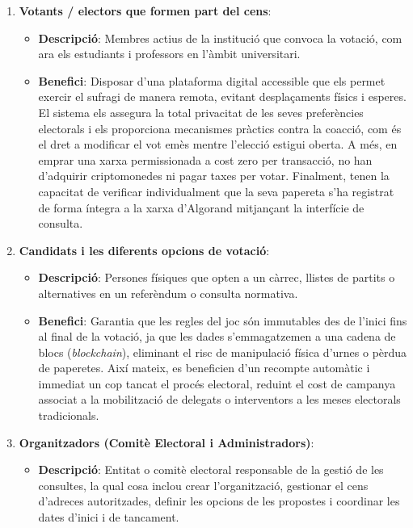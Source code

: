 \begin{enumerate}
    \item \textbf{Votants / electors que formen part del cens}:
    \begin{itemize}
        \item \textbf{Descripció}: Membres actius de la institució que convoca la votació, com ara els estudiants i
        professors en l'àmbit universitari.

        \item \textbf{Benefici}: Disposar d'una plataforma digital accessible que els permet exercir el sufragi de
        manera remota, evitant desplaçaments físics i esperes.
        El sistema els assegura la total privacitat de les seves preferències electorals i els proporciona mecanismes
        pràctics contra la coacció, com és el dret a modificar el vot emès mentre l'elecció estigui oberta.
        A més, en emprar una xarxa permissionada a cost zero per transacció, no han d'adquirir criptomonedes ni pagar
        taxes per votar.
        Finalment, tenen la capacitat de verificar individualment que la seva papereta s'ha registrat de forma íntegra a
        la xarxa d'Algorand mitjançant la interfície de consulta.
    \end{itemize}

    \item \textbf{Candidats i les diferents opcions de votació}:
    \begin{itemize}
        \item \textbf{Descripció}: Persones físiques que opten a un càrrec, llistes de partits o alternatives en un
        referèndum o consulta normativa.

        \item \textbf{Benefici}: Garantia que les regles del joc són immutables des de l'inici fins al final de la
        votació, ja que les dades s'emmagatzemen a una cadena de blocs (\textit{blockchain}), eliminant el risc de
        manipulació física d'urnes o pèrdua de paperetes.
        Així mateix, es beneficien d'un recompte automàtic i immediat un cop tancat el procés electoral, reduint el cost
        de campanya associat a la mobilització de delegats o interventors a les meses electorals tradicionals.
    \end{itemize}

    \item \textbf{Organitzadors (Comitè Electoral i Administradors)}:
    \begin{itemize}
        \item \textbf{Descripció}: Entitat o comitè electoral responsable de la gestió de les consultes, la qual cosa
        inclou crear l'organització, gestionar el cens d'adreces autoritzades, definir les opcions de les propostes i
        coordinar les dates d'inici i de tancament.


\end{itemize}
\end{enumerate}
